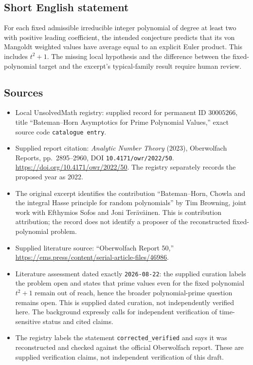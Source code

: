 \documentclass[11pt]{article}
\begin{document}
\subsection{Short English statement}
For each fixed admissible irreducible integer polynomial of degree at least two with positive leading coefficient, the intended conjecture predicts that its von Mangoldt weighted values have average equal to an explicit Euler product. This includes \(t^2+1\). The missing local hypothesis and the difference between the fixed-polynomial target and the excerpt's typical-family result require human review.
\subsection{Sources}
\begin{itemize}
\item Local UnsolvedMath registry: supplied record for permanent ID \(30005266\), title ``Bateman--Horn Asymptotics for Prime Polynomial Values,'' exact source code \texttt{catalogue entry}.
\item Supplied report citation: \emph{Analytic Number Theory} (2023), Oberwolfach Reports, pp.\ 2895--2960, DOI \texttt{10.4171/owr/2022/50}. \url{https://doi.org/10.4171/owr/2022/50}. The registry separately records the proposed year as 2022.
\item The original excerpt identifies the contribution ``Bateman--Horn, Chowla and the integral Hasse principle for random polynomials'' by Tim Browning, joint work with Efthymios Sofos and Joni Ter\"av\"ainen. This is contribution attribution; the record does not identify a proposer of the reconstructed fixed-polynomial problem.
\item Supplied literature source: ``Oberwolfach Report 50,'' \url{https://ems.press/content/serial-article-files/46986}.
\item Literature assessment dated exactly \texttt{2026-08-22}: the supplied curation labels the problem open and states that prime values even for the fixed polynomial \(t^2+1\) remain out of reach, hence the broader polynomial-prime question remains open. This is supplied dated curation, not independently verified here. The background expressly calls for independent verification of time-sensitive status and cited claims.
\item The registry labels the statement \texttt{corrected\_verified} and says it was reconstructed and checked against the official Oberwolfach report. These are supplied verification claims, not independent verification of this draft.
\end{itemize}
\end{document}
